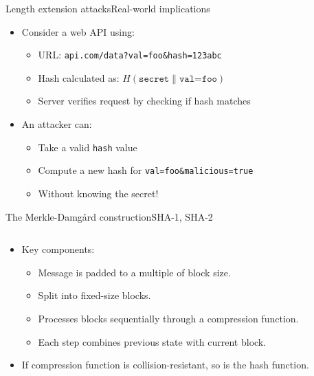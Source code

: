 \documentclass[aspectratio=169, lualatex, handout]{beamer}
\begin{document}
\begin{frame}{Length extension attacks}{Real-world implications}
	\begin{itemize}[<+->]
		\item Consider a web API using:
		      \begin{itemize}
			      \item URL: \texttt{api.com/data?val=foo\&hash=123abc}
			      \item Hash calculated as: $H(\texttt{secret} \| \texttt{val=foo})$
			      \item Server verifies request by checking if hash matches
		      \end{itemize}
		\item An attacker can:
		      \begin{itemize}
			      \item Take a valid \texttt{hash} value
			      \item Compute a new hash for \texttt{val=foo\&malicious=true}
			      \item Without knowing the secret!
		      \end{itemize}
	\end{itemize}
\end{frame}

\begin{frame}{The Merkle-Damgård construction}{SHA-1, SHA-2}
	\begin{columns}[c]
		\begin{column}{0.45\textwidth}
			\begin{itemize}[<+->]
				\item Key components:
				      \begin{itemize}
					      \item Message is padded to a multiple of block size.
					      \item Split into fixed-size blocks.
					      \item Processes blocks sequentially through a compression function.
					      \item Each step combines previous state with current block.
				      \end{itemize}
				\item If compression function is collision-resistant, so is the hash function.
			\end{itemize}
		\end{column}
		\begin{column}{0.55\textwidth}
		\end{column}
	\end{columns}
\end{frame}
\end{document}
